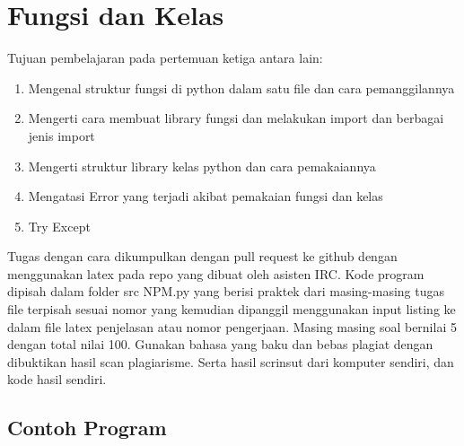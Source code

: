 \chapter{Fungsi dan Kelas}
Tujuan pembelajaran pada pertemuan ketiga antara lain:
\begin{enumerate}
\item
Mengenal struktur fungsi di python dalam satu file dan cara pemanggilannya
\item
Mengerti cara membuat library fungsi dan melakukan import dan berbagai jenis import
\item
Mengerti struktur library kelas python dan cara pemakaiannya
\item
Mengatasi Error yang terjadi akibat pemakaian fungsi dan kelas
\item
Try Except
\end{enumerate}
Tugas dengan cara dikumpulkan dengan pull request ke github dengan menggunakan latex pada repo yang dibuat oleh asisten IRC. Kode program dipisah dalam folder src NPM.py yang berisi praktek dari masing-masing tugas file terpisah sesuai nomor yang kemudian dipanggil menggunakan input listing ke dalam file latex penjelasan atau nomor pengerjaan. Masing masing soal bernilai 5 dengan total nilai 100. Gunakan bahasa yang baku dan bebas plagiat dengan dibuktikan hasil scan plagiarisme. Serta hasil scrinsut dari komputer sendiri, dan kode hasil sendiri.

\section{Contoh Program}
